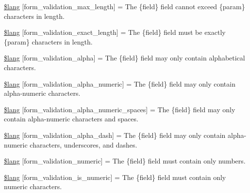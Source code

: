 \begin{DoxyCompactItemize}
\item 
\hyperlink{form__validation__lang_8php_a16f2322f1cb6a1db7a2492d653559522}{\$lang} \mbox{[}\textquotesingle{}form\+\_\+validation\+\_\+max\+\_\+length\textquotesingle{}\mbox{]} = \textquotesingle{}The \{field\} field cannot exceed \{param\} characters in length.\textquotesingle{}
\item 
\hyperlink{form__validation__lang_8php_ad6d3daf6617c3906bc88d6801e74c6c5}{\$lang} \mbox{[}\textquotesingle{}form\+\_\+validation\+\_\+exact\+\_\+length\textquotesingle{}\mbox{]} = \textquotesingle{}The \{field\} field must be exactly \{param\} characters in length.\textquotesingle{}
\item 
\hyperlink{form__validation__lang_8php_a27ff6ba34db740db678c05baa95077bf}{\$lang} \mbox{[}\textquotesingle{}form\+\_\+validation\+\_\+alpha\textquotesingle{}\mbox{]} = \textquotesingle{}The \{field\} field may only contain alphabetical characters.\textquotesingle{}
\item 
\hyperlink{form__validation__lang_8php_ad76e433e4991ed7404c0d44ab47119c0}{\$lang} \mbox{[}\textquotesingle{}form\+\_\+validation\+\_\+alpha\+\_\+numeric\textquotesingle{}\mbox{]} = \textquotesingle{}The \{field\} field may only contain alpha-\/numeric characters.\textquotesingle{}
\item 
\hyperlink{form__validation__lang_8php_a8909b4a4c25b40e7ed1a27cc5b299d90}{\$lang} \mbox{[}\textquotesingle{}form\+\_\+validation\+\_\+alpha\+\_\+numeric\+\_\+spaces\textquotesingle{}\mbox{]} = \textquotesingle{}The \{field\} field may only contain alpha-\/numeric characters and spaces.\textquotesingle{}
\item 
\hyperlink{form__validation__lang_8php_a95a401451435c56b9792be96ffa1bb36}{\$lang} \mbox{[}\textquotesingle{}form\+\_\+validation\+\_\+alpha\+\_\+dash\textquotesingle{}\mbox{]} = \textquotesingle{}The \{field\} field may only contain alpha-\/numeric characters, underscores, and dashes.\textquotesingle{}
\item 
\hyperlink{form__validation__lang_8php_abfd87d5b6c986ce3d4c0498ade54b380}{\$lang} \mbox{[}\textquotesingle{}form\+\_\+validation\+\_\+numeric\textquotesingle{}\mbox{]} = \textquotesingle{}The \{field\} field must contain only numbers.\textquotesingle{}
\item 
\hyperlink{form__validation__lang_8php_a520425fb2cba1854c9df71d98f5645c3}{\$lang} \mbox{[}\textquotesingle{}form\+\_\+validation\+\_\+is\+\_\+numeric\textquotesingle{}\mbox{]} = \textquotesingle{}The \{field\} field must contain only numeric characters.\textquotesingle{}

\end{DoxyCompactItemize}
